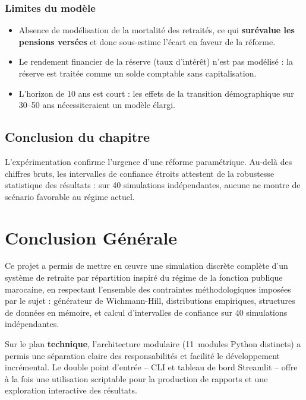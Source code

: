 \documentclass[12pt,a4paper,oneside]{report}
\begin{document}
\subsection{Limites du modèle}

\begin{itemize}
  \item Absence de modélisation de la mortalité des retraités, ce qui
        \textbf{surévalue les pensions versées} et donc sous-estime
        l'écart en faveur de la réforme.
  \item Le rendement financier de la réserve (taux d'intérêt) n'est
        pas modélisé : la réserve est traitée comme un solde comptable
        sans capitalisation.
  \item L'horizon de 10 ans est court : les effets de la transition
        démographique sur 30--50 ans nécessiteraient un modèle élargi.
\end{itemize}

\section{Conclusion du chapitre}

L'expérimentation confirme l'urgence d'une réforme paramétrique. Au-delà
des chiffres bruts, les intervalles de confiance étroits attestent de la
robustesse statistique des résultats : sur 40 simulations indépendantes,
aucune ne montre de scénario favorable au régime actuel.

\chapter*{Conclusion Générale}

Ce projet a permis de mettre en œuvre une simulation discrète complète
d'un système de retraite par répartition inspiré du régime de la fonction
publique marocaine, en respectant l'ensemble des contraintes
méthodologiques imposées par le sujet : générateur de Wichmann-Hill,
distributions empiriques, structures de données en mémoire, et calcul
d'intervalles de confiance sur 40 simulations indépendantes.

Sur le plan \textbf{technique}, l'architecture modulaire (11~modules
Python distincts) a permis une séparation claire des responsabilités et
facilité le développement incrémental. Le double point d'entrée -- CLI
et tableau de bord Streamlit -- offre à la fois une utilisation
scriptable pour la production de rapports et une exploration interactive
des résultats.
\end{document}
